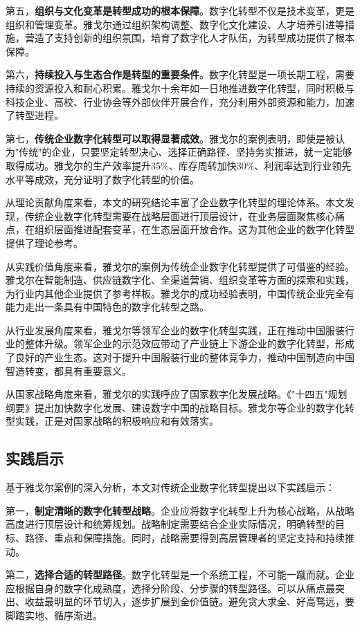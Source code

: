 \documentclass[12pt,a4paper]{article}
\begin{document}
第五，\textbf{组织与文化变革是转型成功的根本保障}。数字化转型不仅是技术变革，更是组织和管理变革。雅戈尔通过组织架构调整、数字化文化建设、人才培养引进等措施，营造了支持创新的组织氛围，培育了数字化人才队伍，为转型成功提供了根本保障。

第六，\textbf{持续投入与生态合作是转型的重要条件}。数字化转型是一项长期工程，需要持续的资源投入和耐心积累。雅戈尔十余年如一日地推进数字化转型，同时积极与科技企业、高校、行业协会等外部伙伴开展合作，充分利用外部资源和能力，加速了转型进程。

第七，\textbf{传统企业数字化转型可以取得显著成效}。雅戈尔的案例表明，即使是被认为"传统"的企业，只要坚定转型决心、选择正确路径、坚持务实推进，就一定能够取得成功。雅戈尔的生产效率提升35\%、库存周转加快30\%、利润率达到行业领先水平等成效，充分证明了数字化转型的价值。

从理论贡献角度来看，本文的研究结论丰富了企业数字化转型的理论体系。本文发现，传统企业数字化转型需要在战略层面进行顶层设计，在业务层面聚焦核心痛点，在组织层面推进配套变革，在生态层面开放合作。这为其他企业的数字化转型提供了理论参考。

从实践价值角度来看，雅戈尔的案例为传统企业数字化转型提供了可借鉴的经验。雅戈尔在智能制造、供应链数字化、全渠道营销、组织变革等方面的探索和实践，为行业内其他企业提供了参考样板。雅戈尔的成功经验表明，中国传统企业完全有能力走出一条具有中国特色的数字化转型之路。

从行业发展角度来看，雅戈尔等领军企业的数字化转型实践，正在推动中国服装行业的整体升级。领军企业的示范效应带动了产业链上下游企业的数字化转型，形成了良好的产业生态。这对于提升中国服装行业的整体竞争力，推动中国制造向中国智造转变，都具有重要意义。

从国家战略角度来看，雅戈尔的实践呼应了国家数字化发展战略。《"十四五"规划纲要》提出加快数字化发展、建设数字中国的战略目标。雅戈尔等企业的数字化转型实践，正是对国家战略的积极响应和有效落实。

\subsection{实践启示}

基于雅戈尔案例的深入分析，本文对传统企业数字化转型提出以下实践启示：

第一，\textbf{制定清晰的数字化转型战略}。企业应将数字化转型上升为核心战略，从战略高度进行顶层设计和统筹规划。战略制定需要结合企业实际情况，明确转型的目标、路径、重点和保障措施。同时，战略需要得到高层管理者的坚定支持和持续推动。

第二，\textbf{选择合适的转型路径}。数字化转型是一个系统工程，不可能一蹴而就。企业应根据自身的数字化成熟度，选择分阶段、分步骤的转型路径。可以从痛点最突出、收益最明显的环节切入，逐步扩展到全价值链。避免贪大求全、好高骛远，要脚踏实地、循序渐进。
\end{document}
